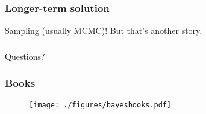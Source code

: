 \documentclass{beamer}
\begin{document}
%	
%
%	
%	
%	

\begin{frame}
	\frametitle{Longer-term solution}
	
	\Huge Sampling (usually MCMC)! But that's another story.
\end{frame}

\begin{frame}
	\frametitle{}
	{\Huge Questions?}
\end{frame}

\begin{frame}
	\frametitle{Books}
	
	\begin{figure}[ht]
		\centerline{\texttt{[image: ./figures/bayesbooks.pdf]}}
	\end{figure}
\end{frame}
\end{document}
